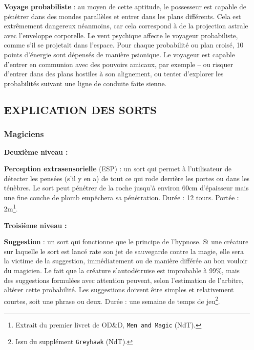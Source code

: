 \documentclass[11pt]{article}
\begin{document}
{\bigskip

\textbf{Voyage probabiliste} : au moyen de cette aptitude, le possesseur est capable de pénétrer dans des mondes parallèles et entrer dans les plans différents. Cela est extrêmement dangereux néanmoins, car cela correspond à de la projection astrale avec l'enveloppe corporelle. Le vent psychique affecte le voyageur probabiliste, comme s'il se projetait dans l'espace. Pour chaque probabilité ou plan croisé, 10 points d'énergie sont dépensés de manière psionique. Le voyageur est capable d'entrer en communion avec des pouvoirs amicaux, par exemple -- ou risquer d'entrer dans des plans hostiles à son alignement, ou tenter d'explorer les probabilités suivant une ligne de conduite faite sienne.

\subsection*{EXPLICATION DES SORTS}

\subsubsection*{Magiciens}

\textbf{Deuxième niveau :}

\bigskip

\textbf{Perception extrasensorielle} (ESP) : un sort qui permet à l'utilisateur de détecter les pensées (s'il y en a) de tout ce qui rode derrière les portes ou dans les ténèbres. Le sort peut pénétrer de la roche jusqu'à environ 60cm d'épaisseur mais une fine couche de plomb empêchera sa pénétration. Durée : 12 tours. Portée : 2m\footnote{Extrait du premier livret de OD\&D, \texttt{Men and Magic} (NdT).}.

\bigskip

\textbf{Troisième niveau :}

\bigskip

\textbf{Suggestion} : un sort qui fonctionne que le principe de l'hypnose. Si une créature sur laquelle le sort est lancé rate son jet de sauvegarde contre la magie, elle sera la victime de la suggestion, immédiatement ou de manière différée au bon vouloir du magicien. Le fait que la créature s'autodétruise est improbable à 99\%, mais des suggestions formulées avec attention peuvent, selon l'estimation de l'arbitre, altérer cette probabilité. Les suggestions doivent être simples et relativement courtes, soit une phrase ou deux. Durée : une semaine de temps de jeu\footnote{Issu du supplément \texttt{Greyhawk} (NdT).}.

}
\end{document}
